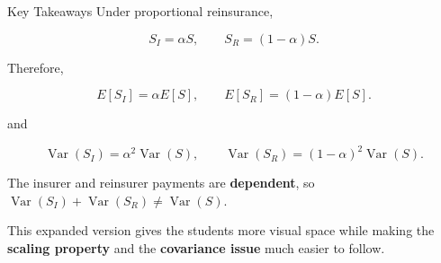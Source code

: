 \documentclass[
  ignorenonframetext,
  aspectratio=169,
]{beamer}
\begin{document}
\begin{frame}{Key Takeaways}
\protect{}\label{key-takeaways}
Under proportional reinsurance,

\[
\boxed{S_I=\alpha S,\qquad S_R=(1-\alpha)S}.
\]

Therefore,

\[
E[S_I]=\alpha E[S],
\qquad
E[S_R]=(1-\alpha)E[S].
\]

and

\[
\operatorname{Var}(S_I)=\alpha^2\operatorname{Var}(S),
\qquad
\operatorname{Var}(S_R)=(1-\alpha)^2\operatorname{Var}(S).
\]

The insurer and reinsurer payments are \textbf{dependent}, so
\(\operatorname{Var}(S_I)+\operatorname{Var}(S_R)\neq\operatorname{Var}(S).\)

This expanded version gives the students more visual space while making
the \textbf{scaling property} and the \textbf{covariance issue} much
easier to follow.
\end{frame}
\end{document}
